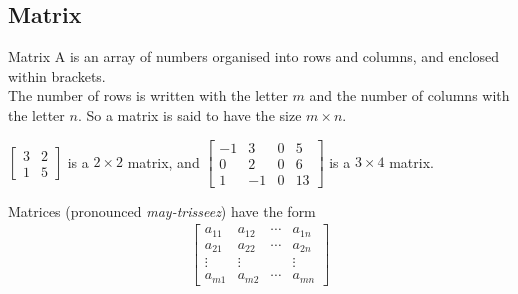 \documentclass[\main/notes.tex]{subfiles}
\begin{document}
			\subsection{Matrix}
				\begin{definition}{Matrix}
					A  is an array of numbers organised into rows and columns, and enclosed within brackets.\\
					The number of rows is written with the letter $m$ and the number of columns with the letter $n$. So a matrix is said to have the size $m \times n$.
				\end{definition}
				\begin{example}[hbox]
					$\begin{bmatrix}
						3 & 2\\
						1 & 5
					\end{bmatrix}$ is a $2 \times 2$ matrix, and
					$\begin{bmatrix}
						-1 & 3 & 0 & 5\\
						0 & 2 & 0 & 6\\
						1 & - 1& 0 & 13
					\end{bmatrix}$ is a $3 \times 4$ matrix.
				\end{example}
				Matrices (pronounced \emph{may-trisseez}) have the form 
				\begin{align*}
					\begin{bmatrix}
						a_{11} & a_{12} & \cdots & a_{1n}\\
						a_{21} & a_{22} & \cdots & a_{2n}\\
						\vdots & \vdots & & \vdots\\
						a_{m1} & a_{m2} & \cdots & a_{mn}
					\end{bmatrix}
				\end{align*}
\end{document}
